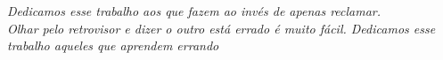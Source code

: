 \begin{dedicatoria}
   \vspace*{\fill}
   \centering
   \noindent

   \textit{Dedicamos esse trabalho aos que fazem ao invés de apenas reclamar.\\
Olhar pelo retrovisor e dizer o outro está errado é muito fácil. Dedicamos esse trabalho aqueles que aprendem errando} \vspace*{\fill}
\end{dedicatoria}
